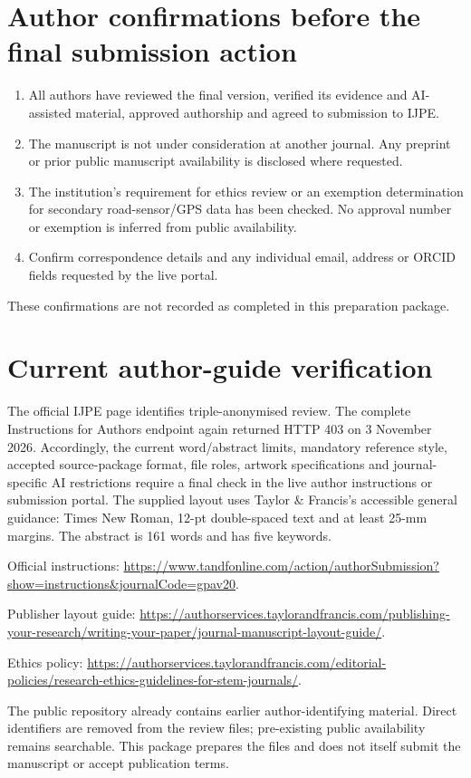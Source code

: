 \documentclass[11pt]{article}
\begin{document}
\section*{Author confirmations before the final submission action}
\begin{enumerate}
\item All authors have reviewed the final version, verified its evidence and AI-assisted material, approved authorship and agreed to submission to IJPE.
\item The manuscript is not under consideration at another journal. Any preprint or prior public manuscript availability is disclosed where requested.
\item The institution's requirement for ethics review or an exemption determination for secondary road-sensor/GPS data has been checked. No approval number or exemption is inferred from public availability.
\item Confirm correspondence details and any individual email, address or ORCID fields requested by the live portal.
\end{enumerate}
These confirmations are not recorded as completed in this preparation package.

\section*{Current author-guide verification}
The official IJPE page identifies triple-anonymised review. The complete Instructions for Authors endpoint again returned HTTP 403 on 3 November 2026. Accordingly, the current word/abstract limits, mandatory reference style, accepted source-package format, file roles, artwork specifications and journal-specific AI restrictions require a final check in the live author instructions or submission portal. The supplied layout uses Taylor \& Francis's accessible general guidance: Times New Roman, 12-pt double-spaced text and at least 25-mm margins. The abstract is 161 words and has five keywords.

Official instructions: \url{https://www.tandfonline.com/action/authorSubmission?show=instructions&journalCode=gpav20}.

Publisher layout guide: \url{https://authorservices.taylorandfrancis.com/publishing-your-research/writing-your-paper/journal-manuscript-layout-guide/}.

Ethics policy: \url{https://authorservices.taylorandfrancis.com/editorial-policies/research-ethics-guidelines-for-stem-journals/}.

The public repository already contains earlier author-identifying material. Direct identifiers are removed from the review files; pre-existing public availability remains searchable. This package prepares the files and does not itself submit the manuscript or accept publication terms.
\end{document}
